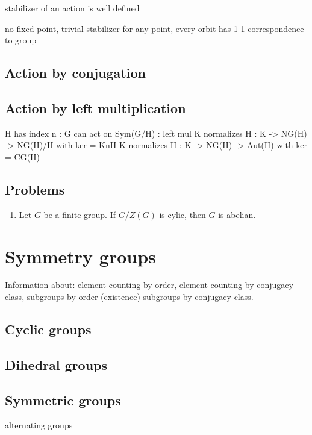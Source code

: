 \documentclass{../../large}
\begin{document}
\begin{prb}
stabilizer of an action is well defined

\end{prb}

\begin{prb}
no fixed point,
trivial stabilizer for any point,
every orbit has 1-1 correspondence to group
\end{prb}

\section{Action by conjugation}


\section{Action by left multiplication}


H has index n  : G can act on Sym(G/H) : left mul
K normalizes H : K -> NG(H) -> NG(H)/H  with ker = KnH
K normalizes H : K -> NG(H) -> Aut(H)  with ker = CG(H)


\section*{Problems}
\begin{enumerate}
\item Let $G$ be a finite group. If $G/Z(G)$ is cylic, then $G$ is abelian.
\end{enumerate}

\chapter{Symmetry groups}

Information about:
element counting by order,
element counting by conjugacy class,
subgroups by order (existence)
subgroups by conjugacy class.



\section{Cyclic groups}
\section{Dihedral groups}
\section{Symmetric groups}
alternating groups
\end{document}
